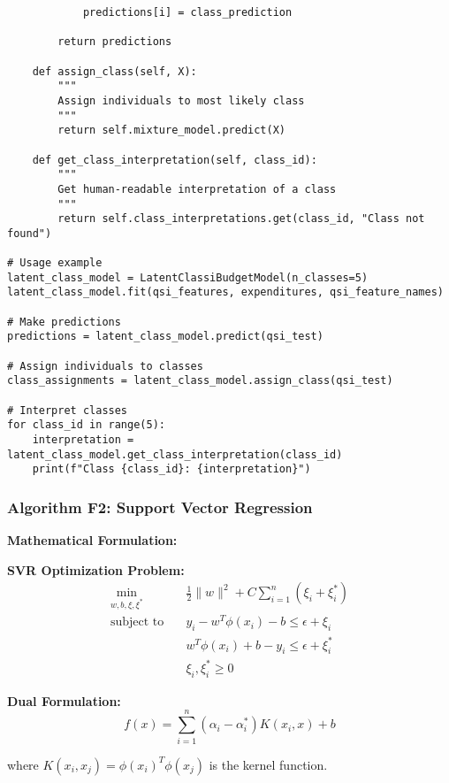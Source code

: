 \begin{lstlisting}
            predictions[i] = class_prediction
        
        return predictions
    
    def assign_class(self, X):
        """
        Assign individuals to most likely class
        """
        return self.mixture_model.predict(X)
    
    def get_class_interpretation(self, class_id):
        """
        Get human-readable interpretation of a class
        """
        return self.class_interpretations.get(class_id, "Class not found")

# Usage example
latent_class_model = LatentClassiBudgetModel(n_classes=5)
latent_class_model.fit(qsi_features, expenditures, qsi_feature_names)

# Make predictions
predictions = latent_class_model.predict(qsi_test)

# Assign individuals to classes
class_assignments = latent_class_model.assign_class(qsi_test)

# Interpret classes
for class_id in range(5):
    interpretation = latent_class_model.get_class_interpretation(class_id)
    print(f"Class {class_id}: {interpretation}")
\end{lstlisting}

\subsubsection{Algorithm F2: Support Vector Regression}

\textbf{Mathematical Formulation:}

\textbf{SVR Optimization Problem:}
\begin{align}
\min_{w,b,\xi,\xi^*} \quad & \frac{1}{2}\|w\|^2 + C\sum_{i=1}^{n}(\xi_i + \xi_i^*) \\
\text{subject to} \quad & y_i - w^T\phi(x_i) - b \leq \epsilon + \xi_i \\
& w^T\phi(x_i) + b - y_i \leq \epsilon + \xi_i^* \\
& \xi_i, \xi_i^* \geq 0
\end{align}

\textbf{Dual Formulation:}
\begin{equation}
f(x) = \sum_{i=1}^{n}(\alpha_i - \alpha_i^*)K(x_i, x) + b
\end{equation}

where $K(x_i, x_j) = \phi(x_i)^T\phi(x_j)$ is the kernel function.

